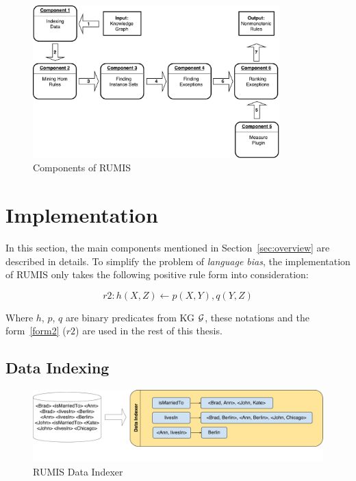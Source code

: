 \begin{figure}[ht]
\centering
\includegraphics[width=0.85\textwidth]{figures/system_overview}
\caption{Components of RUMIS}
\label{system_overview}
\end{figure}

\section{Implementation}

In this section, the main components mentioned in Section~\ref{sec:overview} are described in details. To simplify the problem of \textit{language bias}, the implementation of RUMIS only takes the following positive rule form into consideration:

\begin{equation}
r2: h(X, Z) \leftarrow p(X, Y), q(Y, Z)
\label{form2}
\end{equation}

Where $h$, $p$, $q$ are binary predicates from KG $\mathcal{G}$, these notations and the form~\ref{form2} ($r2$) are used in the rest of this thesis.

\subsection{Data Indexing}
\label{data_indexing}

\begin{figure}[ht]
\centering
\includegraphics[width=1.0\textwidth]{figures/data_indexing}
\caption{RUMIS Data Indexer}
\label{data_indexing}
\end{figure}


